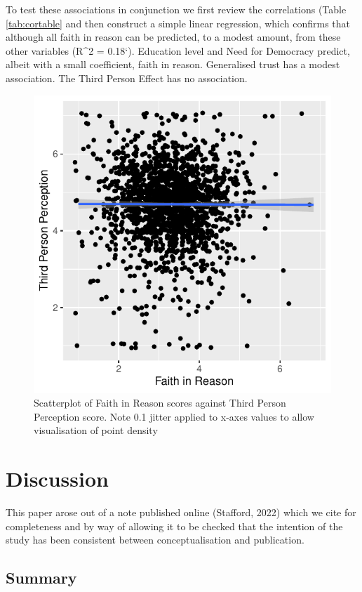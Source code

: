 \documentclass[
  ,jou,floatsintext]{apa6}
\begin{document}
To test these associations in conjunction we first review the correlations (Table \ref{tab:cortable} and then construct a simple linear regression, which confirms that although all faith in reason can be predicted, to a modest amount, from these other variables (R\^{}2 = 0.18`). Education level and Need for Democracy predict, albeit with a small coefficient, faith in reason. Generalised trust has a modest association. The Third Person Effect has no association.

\begin{figure}

{\centering \includegraphics[width=0.75\linewidth]{faithinreason_files/figure-latex/tpe-1} 

}

\caption{Scatterplot of Faith in Reason scores against Third Person Perception score. Note 0.1 jitter applied to x-axes values to allow visualisation of point density}\label{fig:tpe}
\end{figure}

\hypertarget{discussion}{%
\section{Discussion}\label{discussion}}

This paper arose out of a note published online (Stafford, 2022) which we cite for completeness and by way of allowing it to be checked that the intention of the study has been consistent between conceptualisation and publication.

\hypertarget{summary-1}{%
\subsection{Summary}\label{summary-1}}
\end{document}
